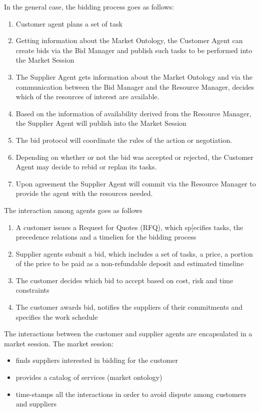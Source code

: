 In the general case, the bidding process goes as follows:
\begin{enumerate}
\item Customer agent plans a set of task
\item Getting information about the Market Ontology, the Customer Agent can create bids via the Bid Manager and publish such tasks to be performed into the Market Session
\item The Supplier Agent gets information about the Market Ontology and via the communication between the Bid Manager and the Resource Manager, decides which of the resources of interest are available.
\item Based on the information of availability derived from the Resource Manager, the Supplier Agent will publish into the Market Session
\item The bid protocol will coordinate the rules of the action or negotiation.
\item Depending on whether or not the bid was accepted or rejected, the Customer Agent may decide to rebid or replan its tasks.
\item Upon agreement the Supplier Agent will commit via the Resource Manager to provide the agent with the resources needed.
\end{enumerate}


The interaction among agents goes as follows
\begin{enumerate}
\item A customer issues a Request for Quotes (RFQ), which sp[ecifies tasks, the precedence relations and a timelien for the bidding process
\item Supplier agents submit a bid, which includes a set of tasks, a price, a portion of the price to be paid as a non-refundable deposit and estimated timeline
\item The customer decides which bid to accept based on cost, risk and time constraints
\item The customer awards bid, notifies the suppliers of their commitments and specifies the work schedule
\end{enumerate}

The interactions between the customer and supplier agents are encapsulated in a market session. The market session:
\begin{itemize}
\item finds suppliers interested in bidding for the customer
\item provides a catalog of services (market ontology)
\item time-stamps all the interactions in order to avoid dispute among customers and suppliers
\end{itemize}

